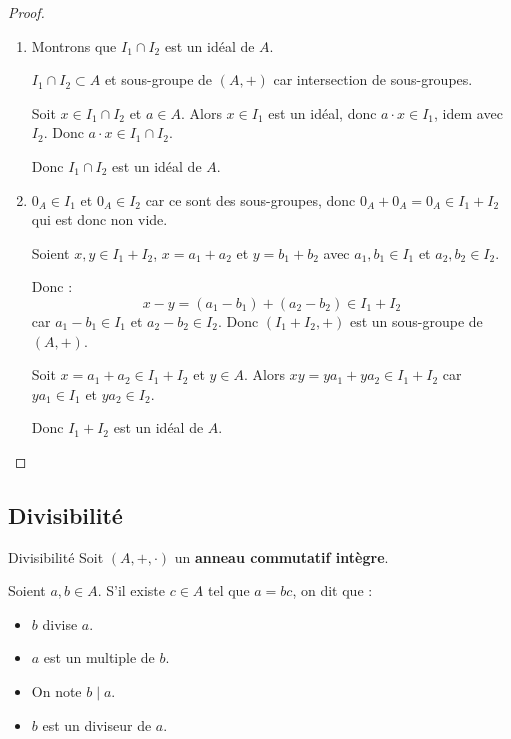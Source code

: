 \begin{proof}~

\begin{enumerate}
    \item Montrons que $I_1 \cap I_2$ est un idéal de $A$.

    $I_1 \cap I_2 \subset A$ et sous-groupe de $(A, +)$ car intersection de sous-groupes.

    Soit $x \in I_1 \cap I_2$ et $a \in A$. Alors $x \in I_1$ est un idéal, donc $a \cdot x \in I_1$, 
    idem avec $I_2$. Donc $a \cdot x \in I_1 \cap I_2$.

    Donc $I_1 \cap I_2$ est un idéal de $A$.
    
    \item $0_A \in I_1$ et $0_A \in I_2$ car ce sont des sous-groupes, donc $0_A  + 0_A = 0_A \in I_1 + I_2$
    qui est donc non vide.

    Soient $x, y \in I_1 + I_2$, $x = a_1 + a_2$ et $y = b_1 + b_2$ avec $a_1, b_1 \in I_1$ et $a_2, b_2 \in I_2$.

    Donc : \[x - y = (a_1 - b_1) + (a_2 - b_2) \in I_1 + I_2\]
    car $a_1 - b_1 \in I_1$ et $a_2 - b_2 \in I_2$.
    Donc $(I_1 + I_2, +)$ est un sous-groupe de $(A, +)$.

    Soit $x = a_1 + a_2 \in I_1 + I_2$ et $y \in A$. Alors 
    $xy = y a_1 + y a_2 \in I_1 + I_2$ car $y a_1 \in I_1$ et $y a_2 \in I_2$.

    Donc $I_1 + I_2$ est un idéal de $A$.
\end{enumerate}
\end{proof}

\subsection{Divisibilité}


\begin{definition}{Divisibilité}{}
    Soit $(A, +, \cdot)$ un \textbf{anneau commutatif intègre}. 

    Soient $a, b \in A$. S'il existe $c \in A$ tel que $a = bc$, on dit que : 
    \begin{itemize}
        \item $b$ divise $a$.
        \item $a$ est un multiple de $b$.
        \item On note $b \mid a$.
        \item $b$ est un diviseur de $a$.
    \end{itemize}
\end{definition}


